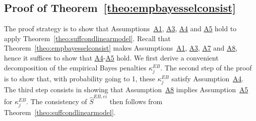 \documentclass[
  12pt]{article}
\begin{document}
\subsection{Proof of Theorem~\ref{theo:empbayesselconsist}} The proof strategy is to show that Assumptions~\hyperlink{lab:A1}{A1}, \hyperlink{lab:A3}{A3}, \hyperlink{lab:A4}{A4} and \hyperlink{lab:A5}{A5} hold to apply Theorem~\ref{theo:suffcondlinearmodel}. Recall that Theorem~\ref{theo:empbayesselconsist} makes Assumptions~\hyperlink{lab:A1}{A1}, \hyperlink{lab:A3}{A3}, \hyperlink{lab:A7}{A7} and \hyperlink{lab:A8}{A8}, hence it suffices to show that \hyperlink{lab:A4}{A4}-\hyperlink{lab:A5}{A5} hold.
We first derive a convenient decomposition of the empirical Bayes penalties $\kappa^{EB}_j$. The second step of the proof is to show that, with probability going to 1, these $\kappa^{EB}_j$ satisfy Assumption~\hyperlink{lab:A4}{A4}. The third step consists in showing that Assumption~\hyperlink{lab:A8}{A8} implies Assumption~\hyperlink{lab:A5}{A5} for $\kappa^{EB}_j$. The consistency of $\hat{S}^{EB,ei}$ then follows from Theorem~\ref{theo:suffcondlinearmodel}.
\end{document}
